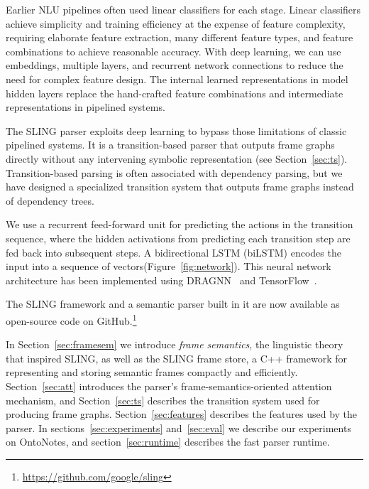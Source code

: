 \documentclass[11pt,a4paper]{article}
\begin{document}
Earlier NLU pipelines often used linear classifiers for each stage.
Linear classifiers achieve simplicity and training efficiency at the expense of
feature complexity, requiring elaborate feature
extraction, many different feature types, and
feature combinations to achieve reasonable accuracy.
With deep learning, we can use embeddings, multiple layers, and recurrent
network connections to reduce the need for complex
feature design. The internal learned representations in model hidden layers
replace the hand-crafted feature combinations and intermediate representations
in pipelined systems.


The SLING parser exploits deep learning to bypass those limitations of classic
pipelined systems.
It is a transition-based parser that outputs frame graphs directly without any
intervening symbolic representation (see Section~\ref{sec:ts}). Transition-based
parsing is often associated with dependency parsing, but we have designed a
specialized transition system that outputs frame graphs instead of dependency
trees.

We use a recurrent feed-forward unit for predicting the actions in the
transition sequence, where the hidden activations from predicting each
transition step are fed back into subsequent steps.
A bidirectional LSTM (biLSTM) encodes the input into a sequence of vectors(Figure~\ref{fig:network}).
This neural network architecture has been implemented using DRAGNN~\cite{dragnn}
and TensorFlow~\cite{tensorflow}.

The SLING framework and a semantic parser built in it are now available as
open-source code on GitHub.\footnote{\url{https://github.com/google/sling}}

In Section~\ref{sec:framesem} we introduce \emph{frame semantics}, the
linguistic theory that inspired SLING, as well as the SLING frame store, a
C++ framework for representing and storing semantic frames compactly and
efficiently.
Section~\ref{sec:att} introduces the parser's frame-semantics-oriented attention
mechanism, and Section~\ref{sec:ts} describes the transition system used for
producing frame graphs. Section~\ref{sec:features} describes the features used
by the parser. In sections~\ref{sec:experiments} and~\ref{sec:eval} we describe
our experiments on OntoNotes, and section~\ref{sec:runtime} describes the
fast parser runtime.
\end{document}

